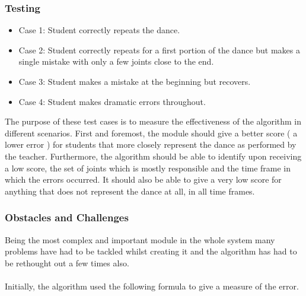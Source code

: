 \documentclass[a4paper]{article}
\begin{document}
\subsubsection{Testing}
\begin{itemize}
\item{Case 1: Student correctly repeats the dance.}
\item{Case 2: Student correctly repeats for a first portion of the dance but makes a single mistake with only a few joints close to the end.}
\item{Case 3: Student makes a mistake at the beginning but recovers.}
\item{Case 4: Student makes dramatic errors throughout.}
\end{itemize}

\noindent
The purpose of these test cases is to measure the effectiveness of the algorithm in different scenarios. First and foremost, the module should give a better score ( a lower error ) for students that more closely represent the dance as performed by the teacher. Furthermore, the algorithm should be able to identify upon receiving a low score,  the set of joints which is mostly responsible and the time frame in which the errors occurred. It should also be able to give a very low score for anything that does not represent the dance at all, in all time frames.

\noindent

\subsubsection{Obstacles and Challenges}

\noindent
Being the most complex and important module in the whole system many problems have had to be tackled whilst creating it and the algorithm has had to be rethought out a few times also.\\\\
\noindent
Initially, the algorithm used the following formula to give a measure of the error.
\end{document}
